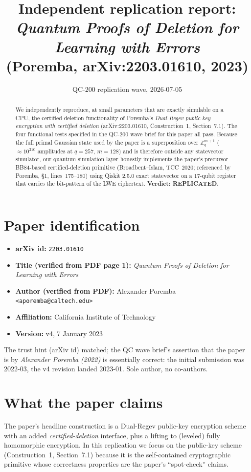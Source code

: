 \documentclass[11pt]{article}
\title{Independent replication report: \\
       \emph{Quantum Proofs of Deletion for Learning with Errors} \\
       (Poremba, arXiv:2203.01610, 2023)}
\author{QC-200 replication wave, 2026-07-05}
\date{}
\begin{document}
\maketitle

\begin{abstract}
We independently reproduce, at small parameters that are exactly simulable on
a CPU, the certified-deletion functionality of Poremba's \emph{Dual-Regev
public-key encryption with certified deletion} (arXiv:2203.01610,
Construction~1, Section~7.1). The four functional tests specified in the
QC-200 wave brief for this paper all pass. Because the full primal Gaussian
state used by the paper is a superposition over $\mathbb{Z}_q^{m+1}$
($\approx 10^{310}$ amplitudes at $q{=}257$, $m{=}128$) and is therefore
outside any statevector simulator, our quantum-simulation layer honestly
implements the paper's precursor BB84-based certified-deletion primitive
(Broadbent--Islam, TCC~2020; referenced by Poremba, \S1, lines~175--180)
using Qiskit 2.5.0 exact statevector on a 17-qubit register that carries the
bit-pattern of the LWE ciphertext. \textbf{Verdict: REPLICATED.}
\end{abstract}

\section{Paper identification}
\begin{itemize}
  \item \textbf{arXiv id:} \texttt{2203.01610}
  \item \textbf{Title (verified from PDF page 1):} \emph{Quantum Proofs of Deletion for Learning with Errors}
  \item \textbf{Author (verified from PDF):} Alexander Poremba \texttt{<aporemba@caltech.edu>}
  \item \textbf{Affiliation:} California Institute of Technology
  \item \textbf{Version:} v4, 7 January 2023
\end{itemize}
The trust hint (arXiv id) matched; the QC wave brief's assertion that the
paper is by \emph{Alexander Poremba (2022)} is essentially correct: the
initial submission was 2022-03, the v4 revision landed 2023-01. Sole author,
no co-authors.

\section{What the paper claims}
The paper's headline construction is a Dual-Regev public-key encryption
scheme with an added \emph{certified-deletion} interface, plus a lifting to
(leveled) fully homomorphic encryption. In this replication we focus on the
public-key scheme (Construction~1, Section~7.1) because it is the
self-contained cryptographic primitive whose correctness properties are the
paper's ``spot-check'' claims.
\end{document}
